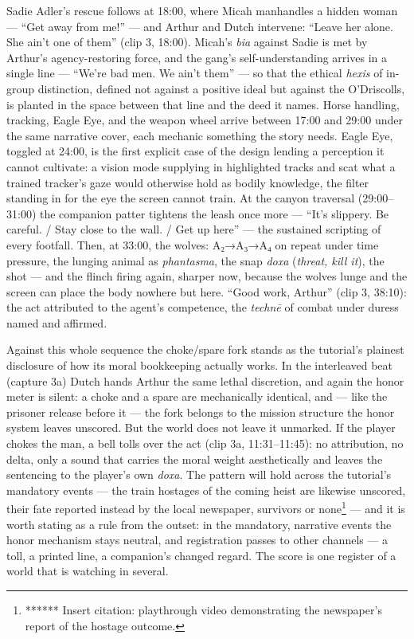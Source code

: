 \documentclass{article}
\begin{document}
Sadie Adler's rescue follows at 18:00, where Micah manhandles a hidden woman — ``Get away from me!'' — and Arthur and Dutch intervene: ``Leave her alone. She ain't one of them'' (clip 3, 18:00). Micah's \textit{bia} against Sadie is met by Arthur's agency-restoring force, and the gang's self-understanding arrives in a single line — ``We're bad men. We ain't them'' — so that the ethical \textit{hexis} of in-group distinction, defined not against a positive ideal but against the O'Driscolls, is planted in the space between that line and the deed it names. Horse handling, tracking, Eagle Eye, and the weapon wheel arrive between 17:00 and 29:00 under the same narrative cover, each mechanic something the story needs. Eagle Eye, toggled at 24:00, is the first explicit case of the design lending a perception it cannot cultivate: a vision mode supplying in highlighted tracks and scat what a trained tracker's gaze would otherwise hold as bodily knowledge, the filter standing in for the eye the screen cannot train. At the canyon traversal (29:00–31:00) the companion patter tightens the leash once more — ``It's slippery. Be careful. / Stay close to the wall. / Get up here'' — the sustained scripting of every footfall. Then, at 33:00, the wolves: A₂→A₃→A₄ on repeat under time pressure, the lunging animal as \textit{phantasma}, the snap \textit{doxa} (\textit{threat, kill it}), the shot — and the flinch firing again, sharper now, because the wolves lunge and the screen can place the body nowhere but here. ``Good work, Arthur'' (clip 3, 38:10): the act attributed to the agent's competence, the \textit{technē} of combat under duress named and affirmed.

Against this whole sequence the choke/spare fork stands as the tutorial's plainest disclosure of how its moral bookkeeping actually works. In the interleaved beat (capture 3a) Dutch hands Arthur the same lethal discretion, and again the honor meter is silent: a choke and a spare are mechanically identical, and — like the prisoner release before it — the fork belongs to the mission structure the honor system leaves unscored. But the world does not leave it unmarked. If the player chokes the man, a bell tolls over the act (clip 3a, 11:31–11:45): no attribution, no delta, only a sound that carries the moral weight aesthetically and leaves the sentencing to the player's own \textit{doxa}. The pattern will hold across the tutorial's mandatory events — the train hostages of the coming heist are likewise unscored, their fate reported instead by the local newspaper, survivors or none\footnote{****** Insert citation: playthrough video demonstrating the newspaper's report of the hostage outcome.} — and it is worth stating as a rule from the outset: in the mandatory, narrative events the honor mechanism stays neutral, and registration passes to other channels — a toll, a printed line, a companion's changed regard. The score is one register of a world that is watching in several.
\end{document}
